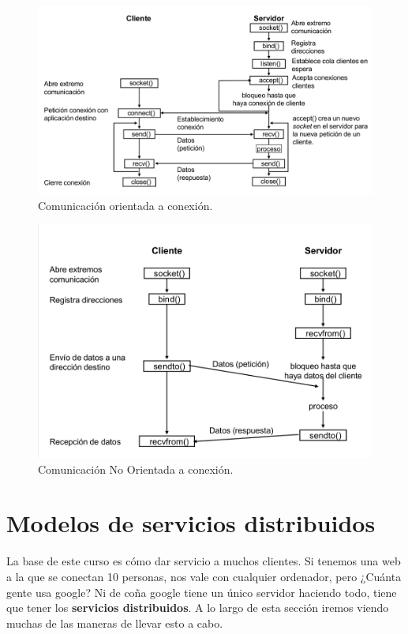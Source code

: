 \begin{figure}[hbtp]
\centering
\includegraphics[width=1\textwidth]{img/SocketConexion.png}
\caption{Comunicación orientada a conexión.}
\label{SocketConexion}
\end{figure}

\begin{figure}[hbtp]
\centering
\includegraphics[width=1\textwidth]{img/SocketNoConexion.png}
\caption{Comunicación No Orientada a conexión.}
\label{SocketNoConexion}
\end{figure}
\newpage
\section{Modelos de servicios distribuidos}

La base de este curso es cómo dar servicio a muchos clientes. Si tenemos una web a la que se conectan 10 personas, nos vale con cualquier ordenador, pero ¿Cuánta gente usa google? Ni de coña google tiene un único servidor haciendo todo, tiene que tener los \textbf{servicios distribuidos}. A lo largo de esta sección iremos viendo muchas de las maneras de llevar esto a cabo.


